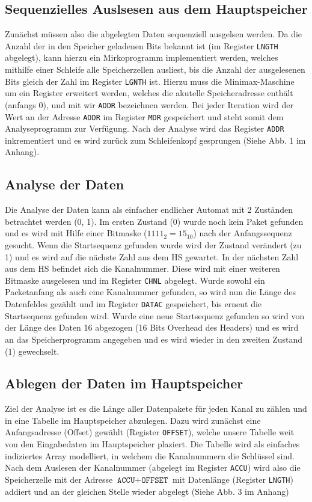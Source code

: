 \documentclass[12pt,titlepage]{article}
\begin{document}
\subsection{Sequenzielles Auslsesen aus dem Hauptspeicher}
Zun{\"a}chst m{\"u}ssen also die abgelegten Daten sequenziell ausgelsen werden. Da die Anzahl der in den Speicher geladenen Bits
bekannt ist (im Register \texttt{LNGTH} abgelegt), kann hierzu ein Mirkoprogramm implementiert werden, welches mithilfe
einer Schleife alle Speicherzellen ausliest, bis die Anzahl der ausgelesenen Bits gleich der Zahl im Register \texttt{LGNTH} ist.
Hierzu muss die Minimax-Maschine um ein Register erweitert werden, welches die akutelle Speicheradresse enth{\"a}lt (anfangs 0),
und mit wir \texttt{ADDR} bezeichnen werden. Bei jeder Iteration wird der Wert an der Adresse \texttt{ADDR} im Register 
\texttt{MDR} gespeichert und steht somit dem Analyseprogramm zur Verf{\"u}gung. Nach der Analyse wird das Register \texttt{ADDR}
inkrementiert und es wird zur{\"u}ck zum Schleifenkopf gesprungen (Siehe Abb. 1 im Anhang).

\subsection{Analyse der Daten}
Die Analyse der Daten kann als einfacher endlicher Automat mit 2 Zuständen betrachtet werden (0, 1). Im ersten Zustand (0)
wurde noch kein Paket gefunden und es wird mit Hilfe einer Bitmaske ($1111_{2} = 15_{10}$) nach der Anfangssequenz gesucht. 
Wenn die Startsequenz gefunden wurde wird der Zustand verändert (zu 1) und es wird auf die nächste Zahl aus dem HS gewartet. 
In der nächsten Zahl aus dem HS befindet sich die Kanalnummer. Diese wird mit einer weiteren Bitmaske ausgelesen
und im Register \texttt{CHNL} abgelegt.
Wurde sowohl ein Packetanfang als auch eine Kanalnummer gefunden, so wird nun die Länge des Datenfeldes gezählt und im Register \texttt{DATAC} gespeichert, bis erneut die Startsequenz gefunden wird.
Wurde eine neue Startsequenz gefunden so wird von der Länge des Daten 16 abgezogen (16 Bits Overhead des Headers) und
es wird an das Speicherprogramm angegeben und es wird wieder in den zweiten Zustand (1) gewechselt.

\subsection{Ablegen der Daten im Hauptspeicher}
Ziel der Analyse ist es die Länge aller Datenpakete für jeden Kanal zu z{\"a}hlen und in eine Tabelle im Hauptspeicher abzulegen.
Dazu wird zunächst eine Anfangsadresse (Offset) gewählt (Register \texttt{OFFSET}), welche unsere Tabelle weit von den Eingabedaten
im Hauptspeicher plaziert. Die Tabelle wird als einfaches indiziertes Array modelliert, in welchem die Kanalnummern die
Schlüssel sind. Nach dem Auslesen der Kanalnummer (abgelegt im Register \texttt{ACCU}) wird also die Speicherzelle mit der Adresse 
$\texttt{ACCU} + \texttt{OFFSET}$ mit Datenlänge (Register \texttt{LNGTH}) addiert und an der gleichen Stelle wieder abgelegt (Siehe
Abb. 3 im Anhang)
\end{document}
